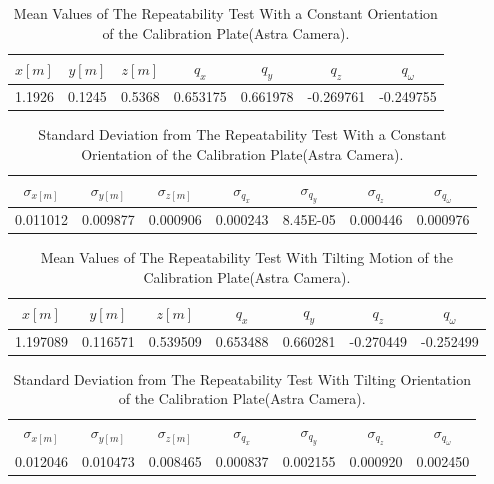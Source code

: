 \begin{table}[ht]
\renewcommand{\arraystretch}{1.3}
\caption{Mean Values of The Repeatability Test With a Constant Orientation of the Calibration Plate(Astra Camera).}
\label{meanastra1}
\centering
\begin{tabular}{|c||c||c||c||c||c||c|}
\hline
$x[m]$ & $y[m]$ & $z[m]$ & $q_{x}$ & $q_{y}$ & $q_{z}$ &$q_{\omega}$ \\
\hline
1.1926 & 0.1245 & 0.5368& 0.653175&	0.661978&	-0.269761&	-0.249755 \\
\hline
\hline
\end{tabular}
\end{table}
\begin{table}[ht]
\renewcommand{\arraystretch}{1.3}
\caption{Standard Deviation from The Repeatability Test With a Constant Orientation of the Calibration Plate(Astra Camera).}
\label{standardastra1}
\centering
\begin{tabular}{|c||c||c||c||c||c||c|}
\hline
$\sigma_{x[m]}$ & $\sigma_{y[m]}$ & $\sigma_{z[m]}$ & $\sigma_{q_{x}}$ & $\sigma_{q_{y}}$ & $\sigma_{q_{z}}$ &$\sigma_{q_{\omega}}$ \\
\hline
0.011012&	0.009877	&0.000906&0.000243&	8.45E-05&	0.000446&	0.000976\\
\hline
\hline
\end{tabular}
\end{table}
\begin{table}[ht]
\renewcommand{\arraystretch}{1.3}
\caption{Mean Values of The Repeatability Test With Tilting Motion of the Calibration Plate(Astra Camera).}
\label{meanastra2}
\centering
\begin{tabular}{|c||c||c||c||c||c||c|}
\hline
$x[m]$ & $y[m]$ & $z[m]$ & $q_{x}$ & $q_{y}$ & $q_{z}$ &$q_{\omega}$ \\
\hline
1.197089&	0.116571&	0.539509&
0.653488&	0.660281&	-0.270449&	-0.252499 \\
\hline
\hline
\end{tabular}
\end{table}
\begin{table}[ht]
\renewcommand{\arraystretch}{1.3}
\caption{Standard Deviation from The Repeatability Test With Tilting Orientation of the Calibration Plate(Astra Camera).}
\label{standardastra2}
\centering
\begin{tabular}{|c||c||c||c||c||c||c|}
\hline
$\sigma_{x[m]}$ & $\sigma_{y[m]}$ & $\sigma_{z[m]}$ & $\sigma_{q_{x}}$ & $\sigma_{q_{y}}$ & $\sigma_{q_{z}}$ &$\sigma_{q_{\omega}}$ \\
0.012046&	0.010473&	0.008465& 0.000837&	0.002155&	0.000920&	0.002450
\\
\hline
\hline
\end{tabular}
\end{table}
